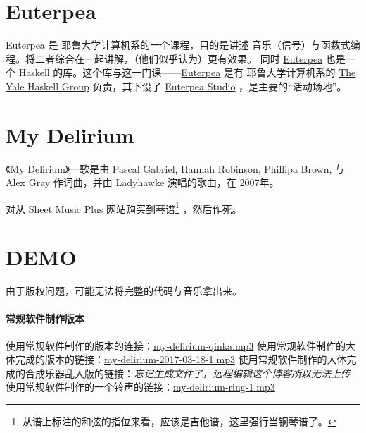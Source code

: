 \section{Euterpea}

Euterpea 是 耶鲁大学计算机系的一个课程，目的是讲述 音乐（信号）与函数式编程。将二者综合在一起讲解，（他们似乎认为）更有效果。
同时 \href{http://www.euterpea.com}{Euterpea} 也是一个 Haskell 的库。这个库与这一门课——\href{http://haskell.cs.yale.edu/euterpea/}{Euterpea}
是有 耶鲁大学计算机系的 \href{http://haskell.cs.yale.edu}{The Yale Haskell Group} 负责，其下设了
\href{http://haskell.cs.yale.edu/euterpea/euterpea-studio/}{Euterpea Studio} ，是主要的“活动场地”。

\section{My Delirium}

《My Delirium》一歌是由 Pascal Gabriel, Hannah Robinson, Phillipa Brown, 与 Alex Gray 作词曲，并由 Ladyhawke 演唱的歌曲，在 2007年。

对从 Sheet Music Plus 网站购买到琴谱\footnote{从谱上标注的和弦的指位来看，应该是吉他谱，这里强行当钢琴谱了。} ，然后作死。


\section{DEMO}

由于版权问题，可能无法将完整的代码与音乐拿出来。

\paragraph{常规软件制作版本}
使用常规软件制作的版本的连接：\href{/res/music/my-delirium-qinka.mp3}{my-delirium-qinka.mp3}
使用常规软件制作的大体完成的版本的链接：\href{/res/music/my-delirium-2017-03-18-1.mp3}{my-delirium-2017-03-18-1.mp3}
使用常规软件制作的大体完成的合成乐器乱入版的链接：\textit{忘记生成文件了，远程编辑这个博客所以无法上传}
使用常规软件制作的一个铃声的链接：\href{/res/music/my-delirium-ring-1.mp3}{my-delirium-ring-1.mp3}

